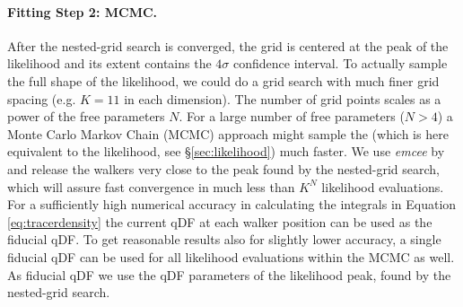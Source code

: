 \paragraph{Fitting Step 2: MCMC.} After the nested-grid search is converged, the grid is centered at the peak of the likelihood and its extent contains the $4\sigma$ confidence interval. To actually sample the full shape of the likelihood, we could do a grid search with much finer grid spacing (e.g. $K=11$ in each dimension). The number of grid points scales as a power of the free parameters $N$. For a large number of free parameters ($N>4$) a Monte Carlo Markov Chain (MCMC) approach might sample the \pdf{} (which is here equivalent to the likelihood, see \S \ref{sec:likelihood}) much faster. We use \emph{emcee} by \citet{2013PASP..125..306F} and release the walkers very close to the \pdf{} peak found by the nested-grid search, which will assure fast convergence in much less than $K^N$ likelihood evaluations.
\\For a sufficiently high numerical accuracy in calculating the integrals in Equation \ref{eq:tracerdensity} the current qDF at each walker position can be used as the fiducial qDF. To get reasonable results also for slightly lower accuracy, a single fiducial qDF can be used for all likelihood evaluations within the MCMC as well. As fiducial qDF we use the qDF parameters of the likelihood peak, found by the nested-grid search.

